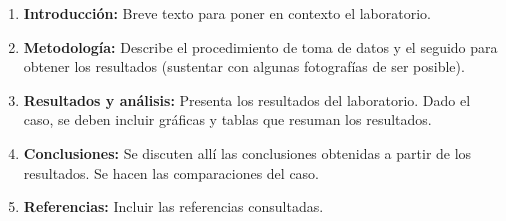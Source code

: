 \documentclass[10pt, a4paper]{exam}
\begin{document}
\begin{enumerate}

    \item \textbf{Introducción:} Breve texto para poner en contexto el laboratorio.
    
    \item \textbf{Metodología:} Describe el procedimiento de toma de datos y el seguido para obtener los resultados (sustentar con algunas fotografías de ser posible).
    
    \item \textbf{Resultados y análisis:} Presenta los resultados del laboratorio. Dado el caso, se deben incluir gráficas y tablas que resuman los resultados.
    
    \item \textbf{Conclusiones:} Se discuten allí las conclusiones obtenidas a partir de los resultados. Se hacen las comparaciones del caso.
    
    \item \textbf{Referencias:} Incluir las referencias consultadas.
\end{enumerate}
\end{document}
